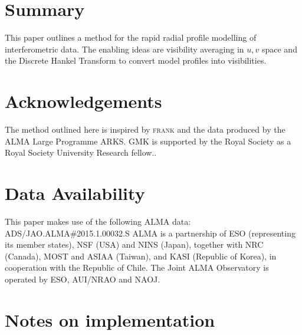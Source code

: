 \documentclass[fleqn,usenatbib]{mnras}
\begin{document}
\section{Summary}

This paper outlines a method for the rapid radial profile modelling of interferometric data. The enabling ideas are visibility averaging in $u,v$ space and the Discrete Hankel Transform to convert model profiles into visibilities.

\section*{Acknowledgements}

The method outlined here is inspired by \textsc{frank} \citep{2020MNRAS.tmp.1491J} and the data produced by the ALMA Large Programme ARKS. GMK is supported by the Royal Society as a Royal Society University Research fellow..

\section*{Data Availability}

This paper makes use of the following ALMA data: ADS/JAO.ALMA\#2015.1.00032.S ALMA is a partnership of ESO (representing its member states), NSF (USA) and NINS (Japan), together with NRC (Canada), MOST and ASIAA (Taiwan), and KASI (Republic of Korea), in cooperation with the Republic of Chile. The Joint ALMA Observatory is operated by ESO, AUI/NRAO and NAOJ.







\appendix

\section{Notes on implementation}
\end{document}
